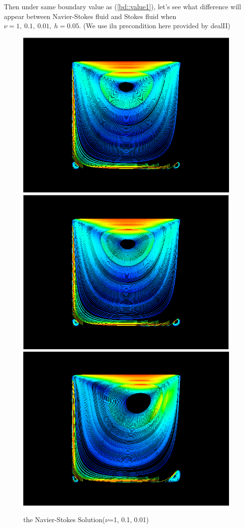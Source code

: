 \documentclass[a4paper]{article}
\begin{document}
\indent Then under same boundary value as (\ref{bd::value1}), let's see what difference will appear between Navier-Stokes fluid and Stokes fluid when $\nu=1,\ 0.1,\ 0.01,\ h=0.05$. (We use ilu precondition here provided by dealII)
\begin{figure}[h]
\centering
\includegraphics[scale = 0.2]{images/a.png}
\includegraphics[scale = 0.2]{images/b.png}
\includegraphics[scale = 0.2]{images/c.png}
\caption{the Navier-Stokes Solution($\nu$=1, 0.1, 0.01)}
\label{im::Navier-Stoke-solution}
\end{figure}
\end{document}
